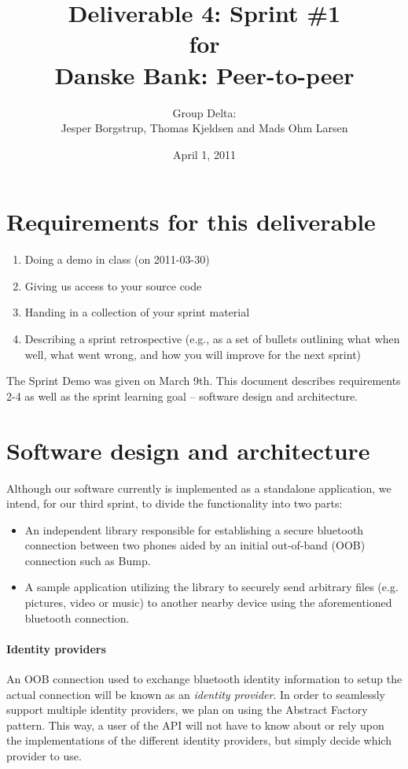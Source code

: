 \documentclass[a4paper,11pt]{article}
\title{Deliverable 4: Sprint \#1\\\small{for}\\\small{Danske Bank: Peer-to-peer}}
\author{ Group Delta:\\Jesper Borgstrup, Thomas Kjeldsen and Mads Ohm Larsen }
\date{April 1, 2011}
\begin{document}
\ifpdf
{}
\else
{}
\fi

\maketitle


\section{Requirements for this deliverable}
\begin{enumerate}
\item Doing a demo in class (on 2011-03-30)
\item Giving us access to your source code
\item Handing in a collection of your sprint material
\item Describing a sprint retrospective (e.g., as a set of bullets outlining what
when well, what went wrong, and how you will improve for the next sprint)
\end{enumerate}

The Sprint Demo was given on March 9th. This document describes requirements 2-4 as well as the sprint learning goal -- software design and architecture.

\section{Software design and architecture}
Although our software currently is implemented as a standalone application, we intend, for our third sprint, to divide the functionality into two parts:
\begin{itemize}
\item An independent library responsible for establishing a secure bluetooth connection between two phones aided by an initial out-of-band (OOB) connection such as Bump.
\item A sample application utilizing the library to securely send arbitrary files (e.g. pictures, video or music) to another nearby device using the aforementioned bluetooth connection.
\end{itemize}

\paragraph{Identity providers}
An OOB connection used to exchange bluetooth identity information to setup the actual connection will be known as an \emph{identity provider}. In order to seamlessly support multiple identity providers, we plan on using the Abstract Factory\cite{GangOfFour} pattern. This way, a user of the API will not have to know about or rely upon the implementations of the different identity providers, but simply decide which provider to use.
\end{document}
